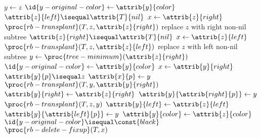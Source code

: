 \documentclass[12pt]{article}
\begin{document}
\begin{codebox}
\li $y \gets{z}$
\li $\id{y-original-color} \gets{\attrib{y}{color}}$
\li \If $\attrib{z}{left} \isequal \attrib{T}{nil}$
\li \Then
        $x \gets{\attrib{z}{right}}$
\li     $\proc{rb-transplant}(T, z, \attrib{z}{right})$ \Comment replace $z$ with right non-nil subtree
\li \ElseIf $\attrib{z}{right} \isequal \attrib{T}{nil}$
\li \Then
        $x \gets{\attrib{z}{left}}$
\li     $\proc{rb-transplant}(T, z, \attrib{z}{left})$ \Comment replace $z$ with left non-nil subtree
\li \Else
\li     $y \gets{\proc{tree-minimum}(\attrib{z}{right})}$
\li     $\id{y-original-color} \gets{\attrib{y}{color}}$
\li     $x \gets{\attrib{y}{right}}$
\li     \If $\attrib{y}{p} \isequal z$
\li     \Then
            $\attrib{x}{p} \gets{y}$
\li     \Else
            $\proc{rb-transplant}(T, y, \attrib{y}{right})$
\li         $\attrib{y}{right} \gets{\attrib{z}{right}}$
\li         $\attrib{y}{\attrib{right}{p}} \gets{y}$
        \End
\li     $\proc{rb-transplant}(T, z, y)$
\li     $\attrib{y}{left} \gets{\attrib{z}{left}}$
\li     $\attrib{y}{\attrib{left}{p}} \gets{y}$
\li     $\attrib{y}{color} \gets{\attrib{z}{color}}$
    \End
\li \If $\id{y-original-color} \isequal \const{black}$
\li \Then
        $\proc{rb-delete-fixup}(T, x)$
    \End
\end{codebox}
\end{document}
